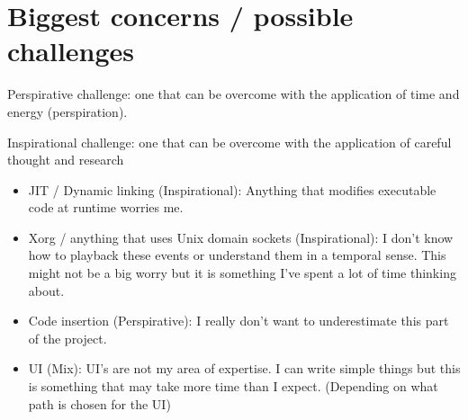 


\section{Biggest concerns / possible challenges}

Perspirative challenge: one that can be overcome with the application of time and energy (perspiration). 

\noindent Inspirational challenge: one that can be overcome with the application of careful thought and research

\begin{itemize}
    \item JIT / Dynamic linking (Inspirational): Anything that modifies executable code at runtime worries me.
    \item Xorg / anything that uses Unix domain sockets (Inspirational): I don't know how to playback these events or understand them in a temporal sense. This might not be a big worry but it is something I've spent a lot of time thinking about. 
    \item Code insertion (Perspirative): I really don't want to underestimate this part of the project. 
    \item UI (Mix): UI's are not my area of expertise. I can write simple things but this is something that may take more time than I expect. (Depending on what path is chosen for the UI)
\end{itemize}


